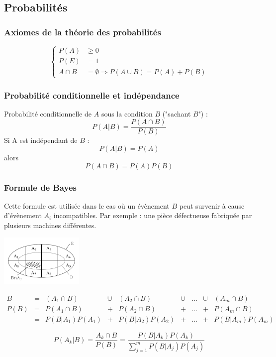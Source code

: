 


\subsection{Probabilités}



\subsubsection{Axiomes de la théorie des probabilités}

\begin{equation*}
\left\{
\begin{aligned}
	P(A) & \geq 0\\
    P(E) & = 1\\
    A \cap B &= \emptyset \Rightarrow P(A \cup B) = P(A)+P(B)
\end{aligned}
\right.
\end{equation*}




\subsubsection{Probabilité conditionnelle et indépendance}



Probabilité conditionnelle de $A$ sous la condition $B$ ("sachant $B$") :
$$P(A|B)=\frac{P(A \cap B)}{P(B)}$$
Si A est indépendant de $B$ :
$$P(A|B)=P(A)$$
alors
$$P(A \cap B)=P(A)P(B)$$





\subsubsection{Formule de Bayes}
Cette formule est utilisée dans le cas où un évènement $B$ peut survenir à cause d'évènement $A_i$ incompatibles. Par exemple : une pièce défectueuse fabriquée par plusieurs machines différentes.
\begin{center}
	\includegraphics[width=0.3\textwidth]{images/formule-de-bayes} 
\end{center}
\begin{center}
	$\begin{array}{CCCCCCCCC}
		B    & = & (A_1 \cap B)      & \cup & (A_2 \cap B)      & \cup & \dots & \cup & (A_m \cap B)\\
		P(B) & = & P(A_1 \cap B)     & +    & P(A_2 \cap B)     & +    & \dots & +    & P(A_m \cap B)\\
		     & = & P(B | A_1) P(A_1) & +    & P(B |A_2) P(A_2) & +    & \dots & +    & P(B |A_m) P(A_m)
	\end{array}$
\end{center}

$$\boxed{P(A_k|B)=\frac{A_k \cap B}{P(B)}=\frac{P(B|A_k)P(A_k)}{\displaystyle\sum_{j=1}^{m}P(B|A_j)P(A_j)}}$$